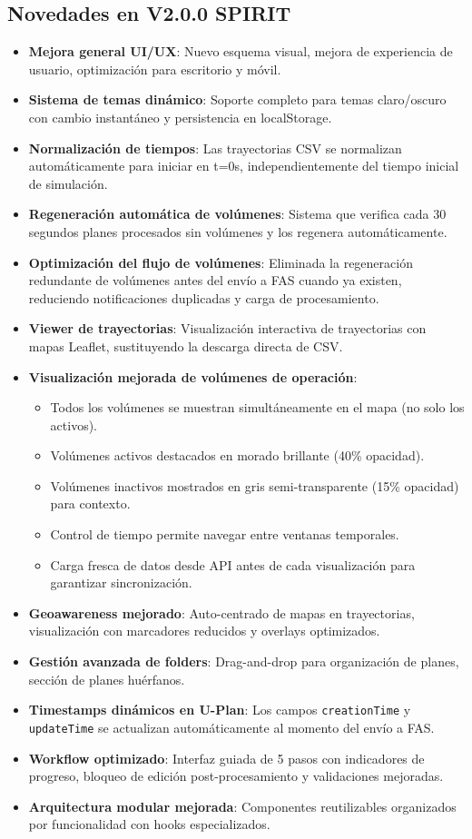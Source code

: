\documentclass[12pt,a4paper]{article}
\begin{document}
\subsection*{Novedades en V2.0.0 SPIRIT}
\begin{itemize}
    \item \textbf{Mejora general UI/UX}: Nuevo esquema visual, mejora de experiencia de usuario, optimización para escritorio y móvil.
    \item \textbf{Sistema de temas dinámico}: Soporte completo para temas claro/oscuro con cambio instantáneo y persistencia en localStorage.
    \item \textbf{Normalización de tiempos}: Las trayectorias CSV se normalizan automáticamente para iniciar en t=0s, independientemente del tiempo inicial de simulación.
    \item \textbf{Regeneración automática de volúmenes}: Sistema que verifica cada 30 segundos planes procesados sin volúmenes y los regenera automáticamente.
    \item \textbf{Optimización del flujo de volúmenes}: Eliminada la regeneración redundante de volúmenes antes del envío a FAS cuando ya existen, reduciendo notificaciones duplicadas y carga de procesamiento.
    \item \textbf{Viewer de trayectorias}: Visualización interactiva de trayectorias con mapas Leaflet, sustituyendo la descarga directa de CSV.
    \item \textbf{Visualización mejorada de volúmenes de operación}:
    \begin{itemize}
        \item Todos los volúmenes se muestran simultáneamente en el mapa (no solo los activos).
        \item Volúmenes activos destacados en morado brillante (40\% opacidad).
        \item Volúmenes inactivos mostrados en gris semi-transparente (15\% opacidad) para contexto.
        \item Control de tiempo permite navegar entre ventanas temporales.
        \item Carga fresca de datos desde API antes de cada visualización para garantizar sincronización.
    \end{itemize}
    \item \textbf{Geoawareness mejorado}: Auto-centrado de mapas en trayectorias, visualización con marcadores reducidos y overlays optimizados.
    \item \textbf{Gestión avanzada de folders}: Drag-and-drop para organización de planes, sección de planes huérfanos.
    \item \textbf{Timestamps dinámicos en U-Plan}: Los campos \texttt{creationTime} y \texttt{updateTime} se actualizan automáticamente al momento del envío a FAS.
    \item \textbf{Workflow optimizado}: Interfaz guiada de 5 pasos con indicadores de progreso, bloqueo de edición post-procesamiento y validaciones mejoradas.
    \item \textbf{Arquitectura modular mejorada}: Componentes reutilizables organizados por funcionalidad con hooks especializados.
\end{itemize}
\end{document}
